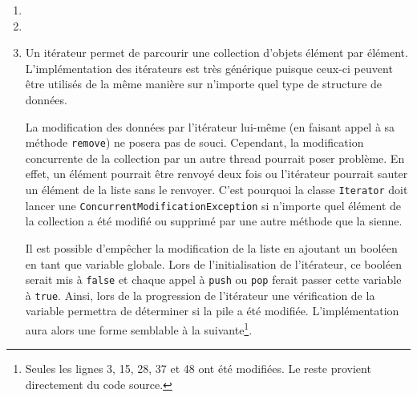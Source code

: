 \begin{enumerate}
        \begin{lstlisting}
public void processFile(String fileName) throws IOException {
        FileInputStream in = new FileInputStream(new File(fileName));
        int b;
        while((b = in.read()) != -1) {
                // Process b
        }
        in.close();
}
        \end{lstlisting}

        \begin{lstlisting}
public void writeFile(String fileName, int[] data) throws IOException {
        FileOutputStream out = new FileOutputStream(new File(fileName));
        for(int i = 0; i < data.length; i++) {
                out.write(data[i]);
        }
        out.close();
}
        \end{lstlisting}

	\item
	\item
	\item Un itérateur permet de parcourir une collection
        d'objets élément par élément. L'implémentation des
        itérateurs est très générique puisque ceux-ci peuvent
        être utilisés de la même manière sur n'importe quel
        type de structure de données.
	
	La modification des données par l'itérateur lui-même
        (en faisant appel à sa méthode \lstinline{remove}) ne posera pas
        de souci. Cependant, la modification concurrente de
        la collection par un autre thread pourrait poser problème.
        En effet, un élément pourrait être renvoyé deux fois ou
        l'itérateur pourrait sauter un élément de la liste sans
        le renvoyer. C'est pourquoi la classe \lstinline{Iterator} doit lancer
        une \lstinline{ConcurrentModificationException} si n'importe quel élément
        de la collection a été modifié ou supprimé par une autre
        méthode que la sienne.\cite{java-sdz}
	 
	Il est possible d'empêcher la modification de la liste en
        ajoutant un booléen en tant que variable globale. Lors de
        l'initialisation de l'itérateur, ce booléen serait mis à
        \lstinline{false} et chaque appel à
        \lstinline{push} ou \lstinline{pop}
        ferait passer cette variable à \lstinline{true}.
        Ainsi, lors de la progression de l'itérateur une vérification
        de la variable permettra de déterminer si la pile a été modifiée.
        L'implémentation aura alors une forme semblable à la
        suivante\footnote{Seules les lignes 3, 15, 28, 37 et 48 ont
        été modifiées. Le reste provient directement du code source.}.
	 

\end{enumerate}
